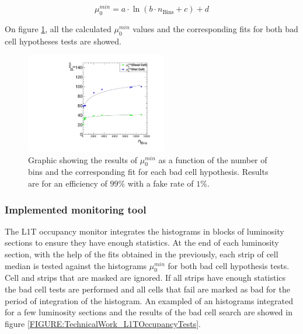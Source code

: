 \begin{equation}
\mu_{0}^{min}= a \cdot \ln(b \cdot n_{\text{Bins}} + c) + d
\label{EQUATION:TechnicalWork_Occupancy_MuMinFits}
\end{equation}

On figure \ref{FIGURE:TechnicalWork_L1TOccupancyMuMin}, all the calculated $\mu_0^{min}$ values and the corresponding fits for both bad cell hypotheses tests are showed.

\begin{figure}[!htb]
\centering
\includegraphics[width=0.55\textwidth]{Chapter03/L1TOnline/Images/L1TOccupancy_MuMin.pdf}
\caption{Graphic showing the results of $\mu_0^{min}$ as a function of the number of bins and the corresponding fit for each bad cell hypothesis. Results are for an efficiency of $99\%$ with a fake rate of $1\%$.}
\label{FIGURE:TechnicalWork_L1TOccupancyMuMin}
\end{figure}

\subsubsection{Implemented monitoring tool}


The \gls{L1T} occupancy monitor integrates the histograms in blocks of luminosity sections to ensure they have enough statistics. At the end of each luminosity section, with the help of the fits obtained in the previously, each strip of cell median is tested against the histograms $\mu_0^{min}$ for both bad cell hypothesis tests. Cell and strips that are masked are ignored. If all strips have enough statistics the bad cell tests are performed and all cells that fail are marked as bad for the period of integration of the histogram. An exampled of an histograms integrated for a few luminosity sections and the results of the bad cell search are showed in figure \ref{FIGURE:TechnicalWork_L1TOccupancyTests}. 

